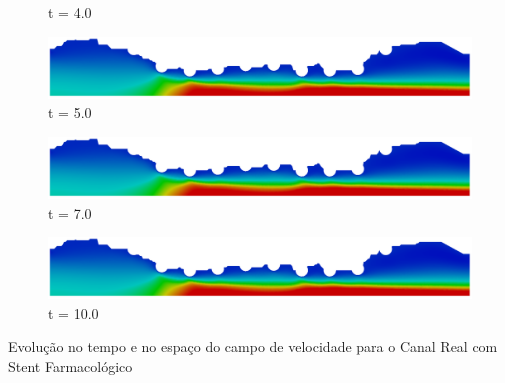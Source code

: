 \begin{frame}
\begin{figure}
\begin{minipage}{.50\linewidth}
      \scriptsize t = 4.0
     \end{minipage}%
     \begin{minipage}{.50\linewidth}
      \centering
      \includegraphics[scale=0.08]{images/vel_RealStrut10000.png}\\
      \scriptsize t = 5.0
 \end{minipage}
     \begin{minipage}{.50\linewidth}
     \medskip
      \centering
      \includegraphics[scale=0.08]{images/vel_RealStrut14000.png}\\
      \scriptsize t = 7.0
     \end{minipage}%
     \begin{minipage}{.50\linewidth}
     \medskip
      \centering
      \includegraphics[scale=0.08]{images/vel_RealStrut20000.png}\\
      \scriptsize t = 10.0
     \end{minipage}
\end{figure}
\vspace{0cm}
\centering \scriptsize Evolução no tempo e no espaço do campo de velocidade para o Canal Real com Stent Farmacológico
\end{frame}



